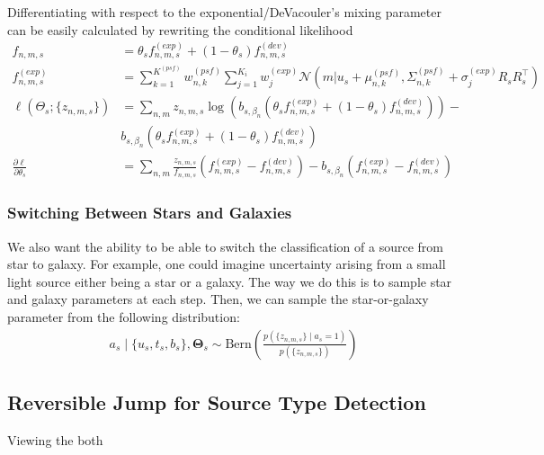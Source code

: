 \documentclass[11pt]{article}
\newcommand{\trans}{\intercal}
\begin{document}
Differentiating with respect to the exponential/DeVacouler's mixing parameter can be easily calculated by rewriting the conditional likelihood
\begin{align}
  f_{n,m,s} &= \theta_s f^{(exp)}_{n,m,s} + (1 - \theta_s) f^{(dev)}_{n,m,s} \\
  f^{(exp)}_{n,m,s} 
    &= \sum_{k=1}^{K^{(psf)}} w_{n,k}^{(psf)} \sum_{j=1}^{K_i} w_j^{(exp)} \mathcal{N} \left(m | u_s + \mu^{(psf)}_{n,k}, \Sigma^{(psf)}_{n,k} + \sigma_j^{(exp)} R_s R_s^\trans \right) \\
  \ell(\Theta_s; \{z_{n,m,s}\}) 
    &= \sum_{n,m} z_{n,m,s} \log\left( b_{s, \beta_n} (\theta_s f^{(exp)}_{n,m,s} + (1 - \theta_s) f^{(dev)}_{n,m,s})\right) - \\
    & b_{s, \beta_n} (\theta_s f^{(exp)}_{n,m,s} + (1 - \theta_s) f^{(dev)}_{n,m,s})  \\ 
  \frac{\partial \ell}{\partial \theta_s} 
    &= \sum_{n,m} \frac{z_{n,m,s}}{f_{n,m,s}} \left(f^{(exp)}_{n,m,s} - f^{(dev)}_{n,m,s}\right) -
       b_{s,\beta_n} \left(f^{(exp)}_{n,m,s} - f^{(dev)}_{n,m,s}\right)
\end{align}

\subsubsection{Switching Between Stars and Galaxies}

We also want the ability to be able to switch the classification of a source from
star to galaxy. For example, one could imagine uncertainty arising
from a small light source either being a star or a galaxy. The way we do this
is to sample star and galaxy parameters at each step. Then, we can sample
the star-or-galaxy parameter from the following distribution:
\begin{align}
a_s \mid \{u_s, t_s, b_s\}, \mathbf{\Theta}_s \sim \text{Bern}\left(\frac{p(\{z_{n,m,s}\} \mid a_s = 1)}{p(\{z_{n,m,s}\})}\right)
\end{align}


\subsection{Reversible Jump for Source Type Detection}

Viewing the both 
\end{document}
